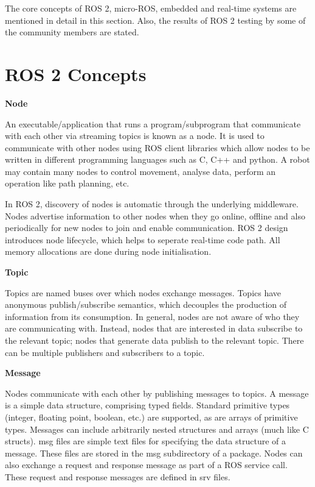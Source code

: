 \documentclass[%
xelatex,
	oneside,		%
	12pt,			%
	parskip=half,	%
	abstracton,
	chapterprefix=true%
    appendixprefix=true]
{scrbook}
\begin{document}
The core concepts of ROS 2, micro-ROS, embedded and real-time systems are mentioned in detail in this section. Also, the results of ROS 2 testing by some of the community members are stated.
	\section{ROS 2 Concepts}
	
	\vspace*{0.5cm}
	{\bfseries Node}
	
	
	\vspace*{0.5cm}
An executable/application that runs a program/subprogram that communicate with each other via streaming topics is known as a node.
It is used to communicate with other nodes using ROS client libraries which allow nodes to be written in different programming languages such as C, C++ and python. A robot may contain many nodes to control movement, analyse data, perform an operation like path planning, etc. 

In ROS 2, discovery of nodes is automatic through the underlying middleware. Nodes advertise information to other nodes when they go online, offline and also periodically for new nodes to join and enable communication. ROS 2 design introduces node lifecycle, which helps to seperate real-time code path. All memory allocations are done during node initialisation.


\vspace*{0.5cm}
	{\bfseries Topic}
	
	
	\vspace*{0.5cm}
	Topics are named buses over which nodes exchange messages. Topics have anonymous publish/subscribe semantics, which decouples the production of information from its consumption. In general, nodes are not aware of who they are communicating with. Instead, nodes that are interested in data subscribe to the relevant topic; nodes that generate data publish to the relevant topic. There can be multiple publishers and subscribers to a topic.\cite{topic}
	
	\vspace*{0.5cm}
	{\bfseries Message}
	
	
	\vspace*{0.5cm}
	Nodes communicate with each other by publishing messages to topics. A message is a simple data structure, comprising typed fields. Standard primitive types (integer, floating point, boolean, etc.) are supported, as are arrays of primitive types. Messages can include arbitrarily nested structures and arrays (much like C structs). msg files are simple text files for specifying the data structure of a message. These files are stored in the msg subdirectory of a package. Nodes can also exchange a request and response message as part of a ROS service call. These request and response messages are defined in srv files.\cite{messages}
	
\end{document}

